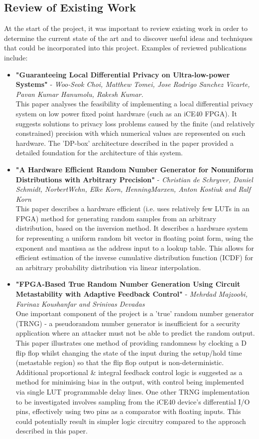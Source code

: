 \documentclass[pageno]{jpaper}
\begin{document}
\subsection{Review of Existing Work}
At the start of the project, it was important to review existing work in order to determine the current state of the art and to discover useful ideas and techniques that could be incorporated into this project. Examples of reviewed publications include:
\begin{itemize}
\item \textbf{"Guaranteeing Local Differential Privacy
on Ultra-low-power Systems"} - \textit{Woo-Seok Choi, Matthew Tomei, Jose Rodrigo Sanchez Vicarte, Pavan Kumar Hanumolu, Rakesh Kumar.}\cite{Choi2018GuaranteeingLD}\\
This paper analyses the feasibility of implementing a local differential privacy system on low power fixed point hardware (such as an iCE40 FPGA). It suggests solutions to privacy loss problems caused by the finite (and relatively constrained) precision with which numerical values are represented on such hardware. The 'DP-box' architecture described in the paper provided a detailed foundation for the architecture of this system.
\item \textbf{"A Hardware Efficient Random Number Generator for
Nonuniform Distributions with Arbitrary Precision"} - \textit{Christian de Schryver, Daniel Schmidt, NorbertWehn, Elke Korn,
HenningMarxen, Anton Kostiuk and Ralf Korn}\cite{DeSchryver}\\
This paper describes a hardware efficient (i.e. uses relatively few LUTs in an FPGA) method for generating random samples from an arbitrary distribution, based on the inversion method. It describes a hardware system for representing a uniform random bit vector in floating point form, using the exponent and mantissa as the address input to a lookup table. This allows for efficient estimation of the inverse cumulative distribution function (ICDF) for an arbitrary probability distribution via linear interpolation.
\item \textbf{"FPGA-Based True Random Number Generation Using Circuit Metastability with Adaptive Feedback Control"} - \textit{Mehrdad Majzoobi, Farinaz Koushanfar
and Srinivas Devadas}\cite{trng}\\
One important component of the project is a 'true' random number generator (TRNG) - a pseudorandom number generator is insufficient for a security application where an attacker must not be able to predict the random output. This paper illustrates one method of providing randomness by clocking a D flip flop whilst changing the state of the input during the setup/hold time (metastable region) so that the flip flop output is non-deterministic. Additional proportional \& integral feedback control logic is suggested as a method for minimising bias in the output, with control being implemented via single LUT programmable delay lines. One other TRNG implementation to be investigated involves sampling from the iCE40 device's differential I/O pins, effectively using two pins as a comparator with floating inputs. This could potentially result in simpler logic circuitry compared to the approach described in this paper.
\end{itemize}
\end{document}
